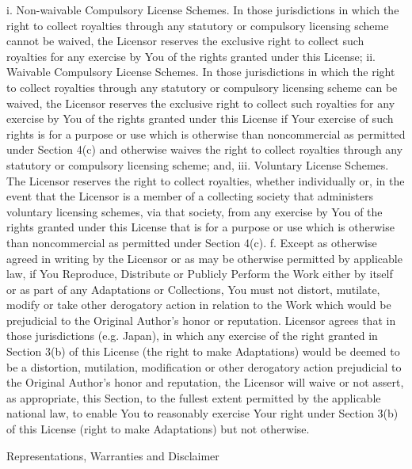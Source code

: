      i. Non-waivable Compulsory License Schemes. In those jurisdictions in
        which the right to collect royalties through any statutory or
        compulsory licensing scheme cannot be waived, the Licensor
        reserves the exclusive right to collect such royalties for any
        exercise by You of the rights granted under this License;
    ii. Waivable Compulsory License Schemes. In those jurisdictions in
        which the right to collect royalties through any statutory or
        compulsory licensing scheme can be waived, the Licensor reserves
        the exclusive right to collect such royalties for any exercise by
        You of the rights granted under this License if Your exercise of
        such rights is for a purpose or use which is otherwise than
        noncommercial as permitted under Section 4(c) and otherwise waives
        the right to collect royalties through any statutory or compulsory
        licensing scheme; and,
   iii. Voluntary License Schemes. The Licensor reserves the right to
        collect royalties, whether individually or, in the event that the
        Licensor is a member of a collecting society that administers
        voluntary licensing schemes, via that society, from any exercise
        by You of the rights granted under this License that is for a
        purpose or use which is otherwise than noncommercial as permitted
        under Section 4(c).
 f. Except as otherwise agreed in writing by the Licensor or as may be
    otherwise permitted by applicable law, if You Reproduce, Distribute or
    Publicly Perform the Work either by itself or as part of any
    Adaptations or Collections, You must not distort, mutilate, modify or
    take other derogatory action in relation to the Work which would be
    prejudicial to the Original Author's honor or reputation. Licensor
    agrees that in those jurisdictions (e.g. Japan), in which any exercise
    of the right granted in Section 3(b) of this License (the right to
    make Adaptations) would be deemed to be a distortion, mutilation,
    modification or other derogatory action prejudicial to the Original
    Author's honor and reputation, the Licensor will waive or not assert,
    as appropriate, this Section, to the fullest extent permitted by the
    applicable national law, to enable You to reasonably exercise Your
    right under Section 3(b) of this License (right to make Adaptations)
    but not otherwise.

\item
Representations, Warranties and Disclaimer

